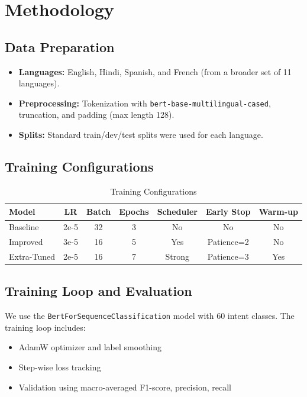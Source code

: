 \documentclass{ecai}
\begin{document}
\section{Methodology}

\subsection{Data Preparation}
\begin{itemize}
    \item \textbf{Languages:} English, Hindi, Spanish, and French (from a broader set of 11 languages).
    \item \textbf{Preprocessing:} Tokenization with \texttt{bert-base-multilingual-cased}, truncation, and padding (max length 128).
    \item \textbf{Splits:} Standard train/dev/test splits were used for each language.
\end{itemize}

\subsection{Training Configurations}
\begin{table}[H]
\centering
\caption{Training Configurations}
\begin{tabular}{lcccccc}
\toprule
Model & LR & Batch & Epochs & Scheduler & Early Stop & Warm-up \\
\midrule
Baseline     & 2e-5 & 32 & 3 & No    & No          & No  \\
Improved     & 3e-5 & 16 & 5 & Yes   & Patience=2  & No  \\
Extra-Tuned  & 2e-5 & 16 & 7 & Strong& Patience=3  & Yes \\
\bottomrule
\end{tabular}
\end{table}

\subsection{Training Loop and Evaluation}
We use the \texttt{BertForSequenceClassification} model with 60 intent classes. The training loop includes:
\begin{itemize}
    \item AdamW optimizer and label smoothing
    \item Step-wise loss tracking
    \item Validation using macro-averaged F1-score, precision, recall
\end{itemize}
\end{document}
